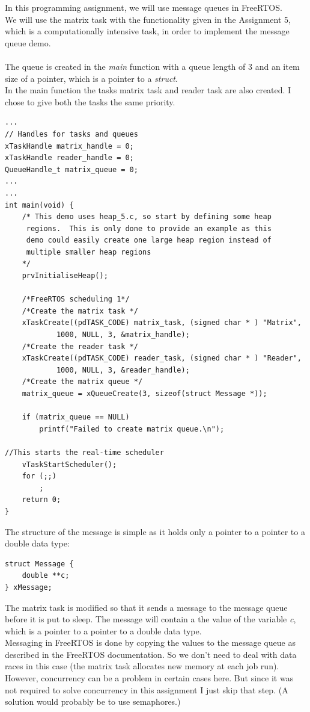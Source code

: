 \documentclass[a4paper]{article}
\begin{document}
In this programming assignment, we will use message queues in FreeRTOS. \\
We will use the matrix task with the functionality given in the Assignment 5, which is a computationally intensive task, in order to implement the message queue demo. \\
\\
The queue is created in the \textit{main} function with a queue length of 3 and an item size of a pointer, which is a pointer to a \textit{struct}. \\
In the main function the tasks matrix task and reader task are also created. I chose to give both the tasks the same priority.\\

\begin{lstlisting}[label=Creation of tasks and queue,caption=Creation of tasks and queue]
...
// Handles for tasks and queues
xTaskHandle matrix_handle = 0;
xTaskHandle reader_handle = 0;
QueueHandle_t matrix_queue = 0;
...
...
int main(void) {
	/* This demo uses heap_5.c, so start by defining some heap
     regions.  This is only done to provide an example as this
     demo could easily create one large heap region instead of
     multiple smaller heap regions
    */
	prvInitialiseHeap();

	/*FreeRTOS scheduling 1*/
	/*Create the matrix task */
	xTaskCreate((pdTASK_CODE) matrix_task, (signed char * ) "Matrix",
    		1000, NULL, 3, &matrix_handle);
	/*Create the reader task */
	xTaskCreate((pdTASK_CODE) reader_task, (signed char * ) "Reader",
    		1000, NULL, 3, &reader_handle);
	/*Create the matrix queue */
	matrix_queue = xQueueCreate(3, sizeof(struct Message *));

	if (matrix_queue == NULL)
		printf("Failed to create matrix queue.\n");

//This starts the real-time scheduler
	vTaskStartScheduler();
	for (;;)
		;
	return 0;
}
\end{lstlisting}

The structure of the message is simple as it holds only a pointer to a pointer to a double data type:\\

\begin{lstlisting}[label=Message structure,caption=Definition of the Message \textit{struct}]
struct Message {
	double **c;
} xMessage;
\end{lstlisting}

The matrix task is modified so that it sends a message to the message queue before it is put to sleep. The message will contain a the value of the variable \textit{c}, which is a pointer to a pointer to a double data type. \\
Messaging in FreeRTOS is done by copying the values to the message queue as described in the FreeRTOS documentation. So we don't need to deal with data races in this case (the matrix task allocates new memory at each job run).\\
However, concurrency can be a problem in certain cases here. But since it was not required to solve concurrency in this assignment I just skip that step. (A solution would probably be to use semaphores.)\\
\end{document}
